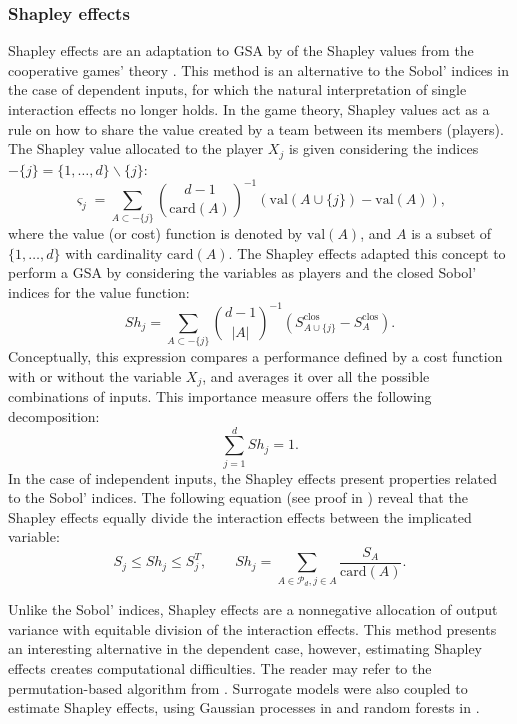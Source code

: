 \subsubsection{Shapley effects}
Shapley effects are an adaptation to GSA by \citet{owen_2014_shapley} of the Shapley values from the cooperative games' theory \citep{shapley_1953}. 
This method is an alternative to the Sobol' indices in the case of dependent inputs, for which the natural interpretation of single interaction effects no longer holds. 
In the game theory, Shapley values act as a rule on how to share the value created by a team between its members (players). 
The Shapley value allocated to the player $X_j$ is given considering the indices $-\{j\}= \{1, \dots, d\} \backslash \{j\}$:
\begin{equation}
    \varsigma_j = \sum_{A \subset -\{j\}} \binom{d-1}{\mathrm{card}(A)}^{-1} \left(\mathrm{val}(A \cup \{j\}) - \mathrm{val}(A)\right),
\end{equation}
where the value (or cost) function is denoted by $\mathrm{val}(A)$, and $A$ is a subset of $\{1, \dots, d\}$ with cardinality $\mathrm{card}(A)$. 
The Shapley effects adapted this concept to perform a GSA by considering the variables as players and the closed Sobol' indices for the value function: 
\begin{equation}
    \label{eq:shapley_effects}
    Sh_j = \sum_{A \subset -\{j\}} \binom{d-1}{|A|}^{-1} \left(S_{A \cup \{j\}}^{\mathrm{clos}} - S_A^{\mathrm{clos}}\right).
\end{equation}
Conceptually, this expression compares a performance defined by a cost function with or without the variable $X_j$, and averages it over all the possible combinations of inputs. 
This importance measure offers the following decomposition: 
\begin{equation}
    \sum_{j=1}^{d} Sh_j = 1.
\end{equation}
In the case of independent inputs, the Shapley effects present properties related to the Sobol' indices. 
The following equation (see proof in \citet{owen_2014_shapley}) reveal that the Shapley effects equally divide the interaction effects between the implicated variable:
\begin{equation}
    S_j \leq Sh_j \leq S_j^T, \qquad Sh_j = \sum_{A \in \mathcal{P}_d, j \in A} \frac{S_A}{\mathrm{card}(A)}.
\end{equation}   

Unlike the Sobol' indices, Shapley effects are a nonnegative allocation of output variance with equitable division of the interaction effects.   
This method presents an interesting alternative in the dependent case, however, estimating Shapley effects creates computational difficulties. 
The reader may refer to the permutation-based algorithm from \citet{song_2016_shapley}. 
Surrogate models were also coupled to estimate Shapley effects, using Gaussian processes in \citet{nazben_2019_shapley} and random forests in \citet{benard_2022_shaff}. 

